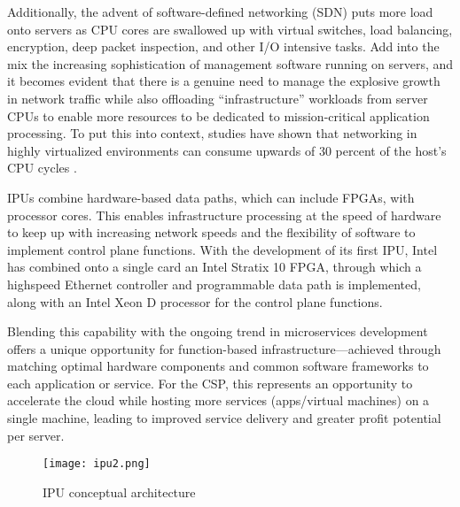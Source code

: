 \documentclass[../sn.tex]{subfiles}
\begin{document}
Additionally, the advent of software-defined networking (SDN)
puts more load onto servers as CPU cores are swallowed up with
virtual switches, load balancing, encryption, deep packet
inspection, and other I/O intensive tasks.
Add into the mix the increasing sophistication of management
software running on servers, and it becomes evident that there
is a genuine need to manage the explosive growth in network
traffic while also offloading “infrastructure” workloads from
server CPUs to enable more resources to be dedicated to
mission-critical application processing.
To put this into context, studies have shown that networking in
highly virtualized environments can consume upwards of 30
percent of the host's CPU cycles \cite{evaleng}.

IPUs combine hardware-based data paths, which can include
FPGAs, with processor cores. This enables infrastructure processing
at the speed of hardware to keep up with increasing network speeds
and the flexibility of software to implement control plane functions.
With the development of its first IPU, Intel has combined onto a
single card an Intel Stratix 10 FPGA, through which a highspeed Ethernet controller and programmable data path is
implemented, along with an Intel Xeon D processor for the
control plane functions.

Blending this capability with the ongoing trend in microservices
development offers a unique opportunity for function-based
infrastructure—achieved through matching optimal hardware
components and common software frameworks to each
application or service. For the CSP, this represents an opportunity to accelerate the
cloud while hosting more services (apps/virtual machines) on a
single machine, leading to improved service delivery and greater
profit potential per server.
\begin{center}
    \begin{figure}
        \texttt{[image: ipu2.png]}
        \caption{IPU conceptual architecture}
    \end{figure}
\end{center}
\end{document}
